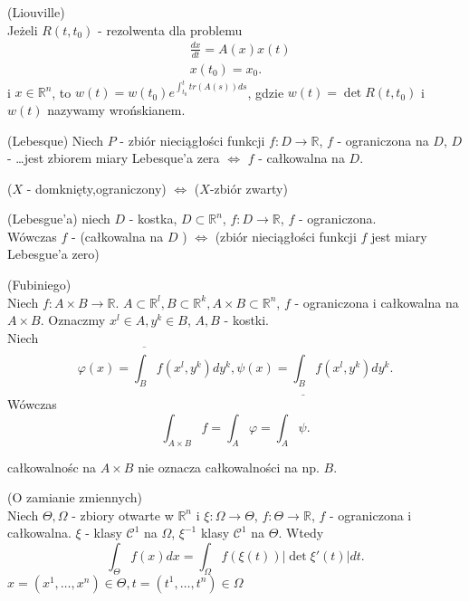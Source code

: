 \documentclass{article}
\begin{document}
\begin{tw}
    (Liouville)\\Jeżeli $R(t,t_0)$ - rezolwenta dla problemu\begin{align*}&\frac{dx}{dt} = A(x)x(t)\\&x(t_0) = x_0.\end{align*}i $x\in \mathbb{R}^n$, to $w(t) = w(t_0)e^{\int_{t_0}^t tr(A(s))ds}$, gdzie $w(t) = \det R(t,t_0)$ i $w(t)$ nazywamy wrońskianem.\\\end{tw}
\begin{tw}
    (Lebesque) Niech $P$ - zbiór nieciągłości funkcji $f: D\to\mathbb{R}$, $f$ - ograniczona na $D$, $D$ - \ldots jest zbiorem miary Lebesque'a zera  $\iff$ $f$ - całkowalna na $D$.\end{tw}
    \begin{stw}
    ($X$ - domknięty,ograniczony) $\iff$ ($X$-zbiór zwarty)\end{stw}
\begin{tw}
    (Lebesgue'a) niech $D$ - kostka, $D\subset \mathbb{R}^n$, $f: D\to \mathbb{R}$, $f$ - ograniczona.\\Wówczas $f$ - (całkowalna na $D$ ) $\iff$ (zbiór nieciągłości funkcji $f$ jest miary Lebesgue'a zero)\end{tw}
    \begin{tw}
    (Fubiniego)\\Niech $f: A\times B\to \mathbb{R}$. $A\subset\mathbb{R}^l, B\subset\mathbb{R}^k, A\times B\subset\mathbb{R}^n$, $f$ - ograniczona i całkowalna na $A\times B$. Oznaczmy $x^l\in A, y^k\in B$, $A,B$ - kostki.\\Niech \[\varphi(x) = \overline{\int_B}f(x^l,y^k)dy^k, \psi(x) = \underline{\int_B} f(x^l, y^k)dy^k.\]Wówczas \[\int_{A\times B} f = \int_A \varphi = \int_A \psi.\]\begin{uwaga}całkowalnośc na $A\times B$ nie oznacza całkowalności na np. $B$.\end{uwaga}\end{tw}
\begin{tw}
    (O zamianie zmiennych)\\Niech $\Theta, \Omega$ - zbiory otwarte w $\mathbb{R}^n$ i $\xi: \Omega\to \Theta$, $f: \Theta\to \mathbb{R}$, $f$ - ograniczona i całkowalna. $\xi$ - klasy $\mathcal{C}^1$ na $\Omega$, $\xi^{-1}$ klasy $\mathcal{C}^{1}$ na $\Theta$. Wtedy\begin{equation}\int_{\Theta} f(x) dx =  \int_{\Omega} f(\xi(t)) | \det \xi'(t) | dt.\end{equation}$x=(x^1,\ldots,x^n)\in \Theta, t=(t^1,\ldots,t^n)\in \Omega$\end{tw}
\end{document}

